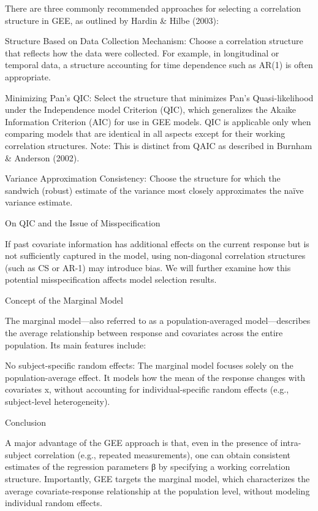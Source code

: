 \documentclass[
]{article}
\begin{document}
There are three commonly recommended approaches for selecting a
correlation structure in GEE, as outlined by Hardin \& Hilbe (2003):

Structure Based on Data Collection Mechanism: Choose a correlation
structure that reflects how the data were collected. For example, in
longitudinal or temporal data, a structure accounting for time
dependence such as AR(1) is often appropriate.

Minimizing Pan's QIC: Select the structure that minimizes Pan's
Quasi-likelihood under the Independence model Criterion (QIC), which
generalizes the Akaike Information Criterion (AIC) for use in GEE
models. QIC is applicable only when comparing models that are identical
in all aspects except for their working correlation structures. Note:
This is distinct from QAIC as described in Burnham \& Anderson (2002).

Variance Approximation Consistency: Choose the structure for which the
sandwich (robust) estimate of the variance most closely approximates the
naïve variance estimate.

On QIC and the Issue of Misspecification

If past covariate information has additional effects on the current
response but is not sufficiently captured in the model, using
non-diagonal correlation structures (such as CS or AR-1) may introduce
bias. We will further examine how this potential misspecification
affects model selection results.

Concept of the Marginal Model

The marginal model---also referred to as a population-averaged
model---describes the average relationship between response and
covariates across the entire population. Its main features include:

No subject-specific random effects: The marginal model focuses solely on
the population-average effect. It models how the mean of the response
changes with covariates x, without accounting for individual-specific
random effects (e.g., subject-level heterogeneity).

Conclusion

A major advantage of the GEE approach is that, even in the presence of
intra-subject correlation (e.g., repeated measurements), one can obtain
consistent estimates of the regression parameters β by specifying a
working correlation structure. Importantly, GEE targets the marginal
model, which characterizes the average covariate-response relationship
at the population level, without modeling individual random effects.
\end{document}

